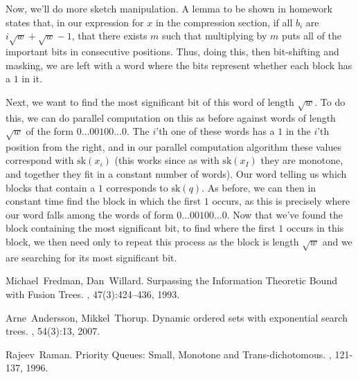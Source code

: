 \documentclass[11pt]{article}
\begin{document}
Now, we'll do more sketch manipulation. A lemma to be shown in homework states that, in our expression for $x$ in the compression section, if all $b_i$ are $i\sqrt{w} + \sqrt{w} - 1$, that there exists $m$ such that multiplying by $m$ puts all of the important bits in consecutive positions. Thus, doing this, then bit-shifting and masking, we are left with a word where the bits represent whether each block has a $1$ in it.

Next, we want to find the most significant bit of this word of length $\sqrt{w}$. To do this, we can do parallel computation on this as before against words of length $\sqrt{w}$ of the form $0\ldots00100\ldots0$. The $i$'th one of these words has a $1$ in the $i$'th position from the right, and in our parallel computation algorithm these values correspond with $\text{sk}(x_i)$ (this works since as with $\text{sk}(x_I)$ they are monotone, and together they fit in a constant number of words). Our word telling us which blocks that contain a $1$ corresponds to $\text{sk}(q)$. As before, we can then in constant time find the block in which the first $1$ occurs, as this is precisely where our word falls among the words of form $0\ldots00100\ldots0$. Now that we've found the block containing the most significant bit, to find where the first $1$ occurs in this block, we then need only to repeat this process as the block is length $\sqrt{w}$ and we are searching for its most significant bit.



\begin{thebibliography}{42}

Michael~Fredman, Dan~Willard.
\newblock Surpassing the Information Theoretic Bound with Fusion Trees.
, 47(3):424--436, 1993.

Arne~Andersson, Mikkel~Thorup.
\newblock Dynamic ordered sets with exponential search trees.
, 54(3):13, 2007.

Rajeev~Raman.
\newblock Priority Queues: Small, Monotone and Trans-dichotomous.
, 121-137, 1996.




\end{thebibliography}
\end{document}

